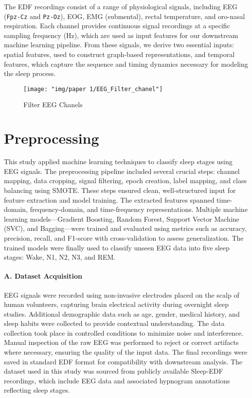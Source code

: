 The EDF recordings consist of a range of physiological signals, including EEG (\texttt{Fpz-Cz} and \texttt{Pz-Oz}), EOG, EMG (submental), rectal temperature, and oro-nasal respiration. Each channel provides continuous signal recordings at a specific sampling frequency (Hz), which are used as input features for our downstream machine learning pipeline. From these signals, we derive two essential inputs: spatial features, used to construct graph-based representations, and temporal features, which capture the sequence and timing dynamics necessary for modeling the sleep process.


\begin{figure}
	\centering
	\texttt{[image: "img/paper 1/EEG\_Filter\_chanel"]}
	\caption{Filter EEG Chanels}
	\label{fig:eegfilterchanel}
\end{figure}


\section{Preprocessing}

This study applied machine learning techniques to classify sleep stages using EEG signals. The preprocessing pipeline included several crucial steps: channel mapping, data cropping, signal filtering, epoch creation, label mapping, and class balancing using SMOTE. These steps ensured clean, well-structured input for feature extraction and model training. The extracted features spanned time-domain, frequency-domain, and time-frequency representations. Multiple machine learning models—Gradient Boosting, Random Forest, Support Vector Machine (SVC), and Bagging—were trained and evaluated using metrics such as accuracy, precision, recall, and F1-score with cross-validation to assess generalization. The trained models were finally used to classify unseen EEG data into five sleep stages: Wake, N1, N2, N3, and REM.

\paragraph{A. Dataset Acquisition}

EEG signals were recorded using non-invasive electrodes placed on the scalp of human volunteers, capturing brain electrical activity during overnight sleep studies. Additional demographic data such as age, gender, medical history, and sleep habits were collected to provide contextual understanding. The data collection took place in controlled conditions to minimize noise and interference. Manual inspection of the raw EEG was performed to reject or correct artifacts where necessary, ensuring the quality of the input data. The final recordings were saved in standard EDF format for compatibility with downstream analysis. The dataset used in this study was sourced from publicly available Sleep-EDF recordings, which include EEG data and associated hypnogram annotations reflecting sleep stages.

